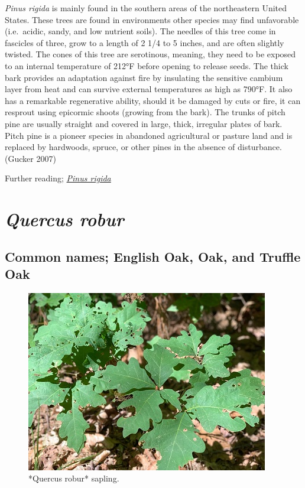 \documentclass[
]{article}
\begin{document}
\emph{Pinus rigida} is mainly found in the southern areas of the northeastern United States. These trees are found in environments other species may find unfavorable (i.e.~acidic, sandy, and low nutrient soils). The needles of this tree come in fascicles of three, grow to a length of 2 1/4 to 5 inches, and are often slightly twisted. The cones of this tree are serotinous, meaning, they need to be exposed to an internal temperature of 212°F before opening to release seeds. The thick bark provides an adaptation against fire by insulating the sensitive cambium layer from heat and can survive external temperatures as high as 790°F. It also has a remarkable regenerative ability, should it be damaged by cuts or fire, it can resprout using epicormic shoots (growing from the bark). The trunks of pitch pine are usually straight and covered in large, thick, irregular plates of bark. Pitch pine is a pioneer species in abandoned agricultural or pasture land and is replaced by hardwoods, spruce, or other pines in the absence of disturbance. (Gucker 2007)

Further reading; \href{https://www.fs.fed.us/database/feis/plants/tree/pinrig/all.html\#Cone\%20survival\%20and\%20seedling\%20establishment:}{\emph{Pinus rigida}}

\hypertarget{quercus-robur}{%
\section{\texorpdfstring{\emph{Quercus robur}}{Quercus robur}}\label{quercus-robur}}

\hypertarget{common-names-english-oak-oak-and-truffle-oak}{%
\subsection{Common names; English Oak, Oak, and Truffle Oak}\label{common-names-english-oak-oak-and-truffle-oak}}

\begin{figure}

{\centering \includegraphics[width=0.5\linewidth]{english} 

}

\caption{*Quercus robur* sapling.}\label{fig:engoak}
\end{figure}
\end{document}
